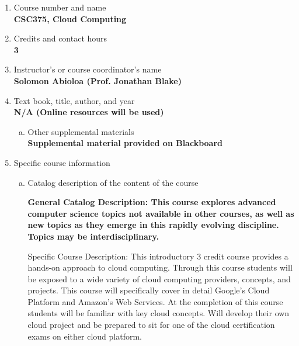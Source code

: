 \label{CSC375-Cloud}  %
\begin{enumerate}[1.]
\item Course number and name\\
  {\bfseries
    CSC375, Cloud Computing
  }

\item Credits and contact hours\\
  {\bfseries
    3
  }

\item Instructor's or course coordinator's name\\
  {\bfseries
    Solomon Abioloa (Prof. Jonathan Blake)
  }

\item Text book, title, author, and year\\
  {\bfseries
    N/A (Online resources will be used)
  }
\begin{enumerate}[a.]
\item Other supplemental materials\\
  {\bfseries
    Supplemental material provided on Blackboard
  }
\end{enumerate}

\item Specific course information
\begin{enumerate}[a.]
\item Catalog description of the content of the course\\
  {\bfseries
General Catalog Description: This course explores advanced computer science topics not available in other courses, as well as new topics as they emerge in this rapidly evolving discipline. Topics may be interdisciplinary.

Specific Course Description: This introductory 3 credit course provides a hands-on approach to cloud computing. Through this course students will be exposed to a wide variety of cloud computing providers, concepts, and projects. This course will specifically cover in detail Google’s Cloud Platform and Amazon’s Web Services. At the completion of this course students will be familiar with key cloud concepts. Will develop their own cloud project and be prepared to sit for one of the cloud certification exams on either cloud platform.
  }


\end{enumerate}
\end{enumerate}
